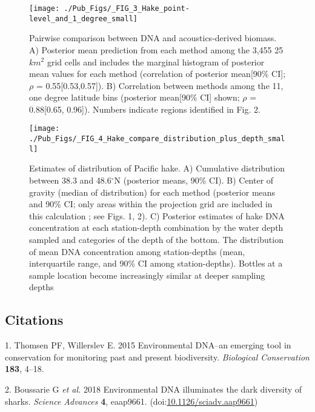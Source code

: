 \documentclass[
]{article}
\begin{document}
\begin{figure}
\texttt{[image: ./Pub\_Figs/\_FIG\_3\_Hake\_point-level\_and\_1\_degree\_small]} \caption{\label{fig:pairwise} Pairwise comparison between  DNA and acoustics-derived biomass. A) Posterior mean prediction from each method among the 3,455 25$km^2$ grid cells and includes the marginal histogram of posterior mean values for each method (correlation of posterior mean[90\% CI]; $\rho$ = 0.55[0.53,0.57]).  B) Correlation between methods among the 11, one degree latitude bins (posterior mean[90\% CI] shown; $\rho$ = 0.88[0.65, 0.96]). Numbers indicate regions identified in Fig. 2.}\label{fig:fig.pairwise}
\end{figure}

\clearpage

\begin{figure}
\texttt{[image: ./Pub\_Figs/\_FIG\_4\_Hake\_compare\_distribution\_plus\_depth\_small]} \caption{\label{fig:COG} Estimates of distribution of Pacific hake. A) Cumulative distribution between 38.3 and 48.6$^{\circ}$N (posterior means, 90\% CI). B) Center of gravity (median of distribution) for each method (posterior means and 90\% CI; only areas within the projection grid are included in this calculation ; see Figs. 1, 2). C) Posterior estimates of hake DNA concentration at each station-depth combination by the water depth sampled and categories of the depth of the bottom. The distribution of mean DNA concentration among station-depths (mean, interquartile range, and 90\% CI among station-depths). Bottles at a sample location become increasingly similar at deeper sampling depths }\label{fig:fig.COG}
\end{figure}

\clearpage

\hypertarget{citations}{%
\subsection*{Citations}\label{citations}}

\hypertarget{refs}{}
\leavevmode\hypertarget{ref-thomsen2015environmental}{}%
1. Thomsen PF, Willerslev E. 2015 Environmental DNA--an emerging tool in
conservation for monitoring past and present biodiversity.
\emph{Biological Conservation} \textbf{183}, 4--18.

\leavevmode\hypertarget{ref-Boussarie2018sharks}{}%
2. Boussarie G \emph{et al.} 2018 Environmental DNA illuminates the dark
diversity of sharks. \emph{Science Advances} \textbf{4}, eaap9661.
(doi:\href{https://doi.org/10.1126/sciadv.aap9661}{10.1126/sciadv.aap9661})
\end{document}
